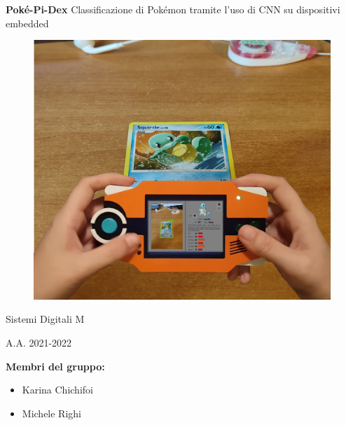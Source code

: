 \documentclass[12pt]{report}
\begin{document}
\thispagestyle{empty}
\begin{titlepage}
  \null\vfill

  \begin{center}

  {\Huge \textbf{Poké-Pi-Dex}}
  \vskip 0.2cm
  {Classificazione di Pokémon tramite l'uso di CNN su dispositivi embedded}
  
  \vskip 0.5cm
  \begin{figure}[h]
  \centering
  \includegraphics[scale=0.28]{./immagini/logo.png}
    \label{logo}
  \end{figure}

  \vskip 0.5cm
  {\Large Sistemi Digitali M}

  \vskip 1cm

  {\large A.A. 2021-2022}
  \end{center}

\vfill
\vfill

\textbf{Membri del gruppo:}
\begin{itemize}
    \item[] Karina Chichifoi
    \item[] Michele Righi
\end{itemize}
\hfill
\end{titlepage}

\tableofcontents






\printbibliography[heading=bibintoc]
\end{document}
